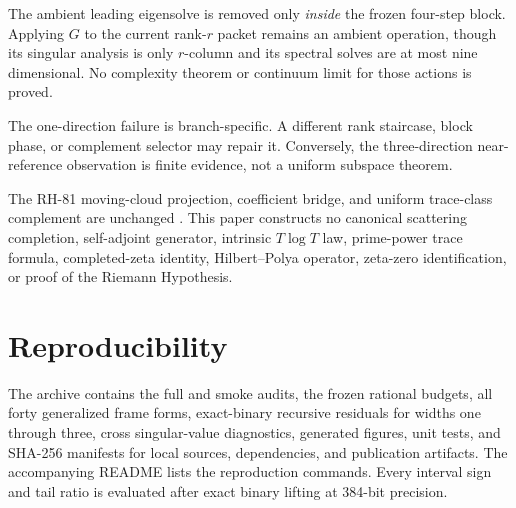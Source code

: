 \documentclass[11pt]{article}
\theoremstyle{definition}
\theoremstyle{remark}
\begin{document}
The ambient leading eigensolve is removed only \emph{inside} the frozen
four-step block.  Applying $G$ to the current rank-$r$ packet remains an
ambient operation, though its singular analysis is only $r$-column and its
spectral solves are at most nine dimensional.  No complexity theorem or
continuum limit for those actions is proved.

The one-direction failure is branch-specific.  A different rank staircase,
block phase, or complement selector may repair it.  Conversely, the
three-direction near-reference observation is finite evidence, not a uniform
subspace theorem.

The RH-81 moving-cloud projection, coefficient bridge, and uniform
trace-class complement are unchanged \citep{WangRouteReview2026}.  This paper
constructs no canonical scattering completion, self-adjoint generator,
intrinsic $T\log T$ law, prime-power trace formula, completed-zeta identity,
Hilbert--Polya operator, zeta-zero identification, or proof of the Riemann
Hypothesis.

\section{Reproducibility}

The archive contains the full and smoke audits, the frozen rational budgets,
all forty generalized frame forms, exact-binary recursive residuals for
widths one through three, cross singular-value diagnostics, generated figures,
unit tests, and SHA-256 manifests for local sources, dependencies, and
publication artifacts.  The accompanying README lists the reproduction
commands.  Every interval sign and tail ratio is evaluated after exact binary
lifting at 384-bit precision.



\end{document}
